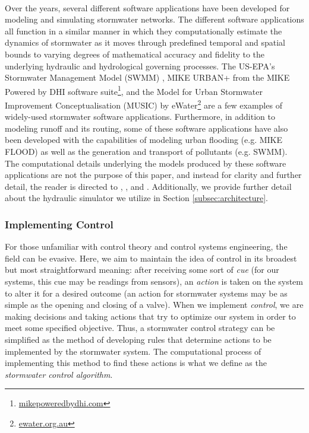 \

Over the years, several different software applications have been developed for modeling and simulating stormwater networks. The different software applications all function in a similar manner in which they computationally estimate the dynamics of stormwater as it moves through predefined temporal and spatial bounds to varying degrees of mathematical accuracy and fidelity to the underlying hydraulic and hydrological governing processes. The US-EPA's Stormwater Management Model (SWMM) \citep{Rossman2015a}, MIKE URBAN+ from the MIKE Powered by DHI software suite\footnote{\href{https://www.mikepoweredbydhi.com/products/mike-urban-plus}{mikepoweredbydhi.com}}, and the Model for Urban Stormwater Improvement Conceptualisation (MUSIC) by eWater\footnote{\href{https://ewater.org.au/products/music/}{ewater.org.au}} are a few examples of widely-used stormwater software applications. Furthermore, in addition to modeling runoff and its routing, some of these software applications have also been developed with the capabilities of modeling urban flooding (e.g. MIKE FLOOD) as well as the generation and transport of pollutants (e.g. SWMM). The computational details underlying the models produced by these software applications are not the purpose of this paper, and instead for clarity and further detail, the reader is directed to \citet{Rossman2015b}, \citet{Rossman2017}, and \citet{Rossman2016}. Additionally, we provide further detail about the hydraulic simulator we utilize in Section \ref{subsec:architecture}.
%
%
%
\subsubsection{Implementing Control}
\label{subsec:implementingcontrol}
%
%
%
For those unfamiliar with control theory and control systems engineering, the field can be evasive. Here, we aim to maintain the idea of control in its broadest but most straightforward meaning: after receiving some sort of \emph{cue} (for our systems, this cue may be readings from sensors), an \emph{action} is taken on the system to alter it for a desired outcome (an action for stormwater systems may be as simple as the opening and closing of a valve). When we implement \emph{control}, we are making decisions and taking actions that try to optimize our system in order to meet some specified objective. Thus, a stormwater control strategy can be simplified as the method of developing rules that determine actions to be implemented by the stormwater system. The computational process of implementing this method to find these actions is what we define as the \emph{stormwater control algorithm}.

